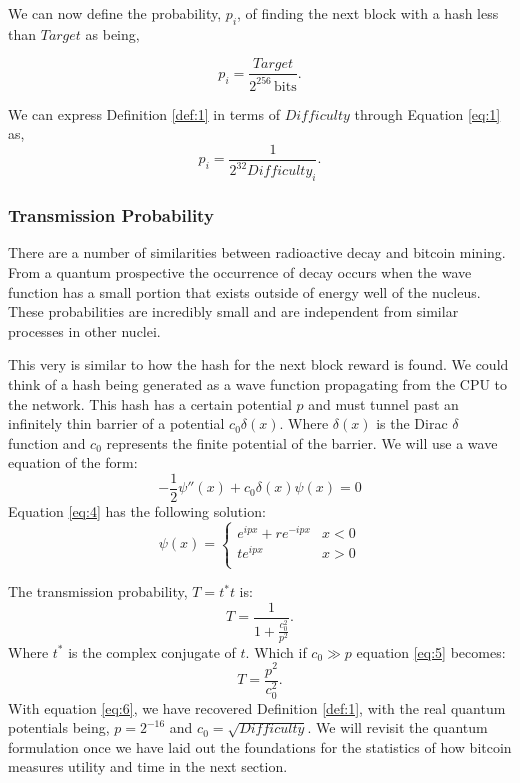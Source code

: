 \documentclass[runningheads]{llncs}
\begin{document}
We can now define the probability, $p_i$, of finding the next block with a hash less than $Target$ as being,
\begin{definition} \label{def:1}
    \begin{equation}
        p_i = \frac{Target}{2^{256}\,\mathrm{bits}}.
    \end{equation}
\end{definition}

We can express Definition \ref{def:1} in terms of $Difficulty$ through Equation \ref{eq:1} as,
\begin{equation}
    p_i = \frac{1}{2^{32}Difficulty_i}. \label{eq:3}
\end{equation}

\subsubsection{Transmission Probability}
There are a number of similarities between radioactive decay and bitcoin mining.
From a quantum prospective the occurrence of decay occurs when the wave function has a small portion that exists outside of energy well of the nucleus.
These probabilities are incredibly small and are independent from similar processes in other nuclei.

This very is similar to how the hash for the next block reward is found.
We could think of a hash being generated as a wave function propagating from the CPU to the network.
This hash has a certain potential $p$ and must tunnel past an infinitely thin barrier of a potential $c_0 \delta(x)$.
Where $\delta(x)$ is the Dirac $\delta$ function and $c_0$ represents the finite potential of the barrier.
We will use a wave equation of the form:
\begin{equation}
    -\frac{1}{2}\psi''(x) + c_0 \delta(x) \psi(x) = 0 \label{eq:4}
\end{equation}
Equation \ref{eq:4} has the following solution:
\begin{equation}
    \psi(x) =\left\{
    \begin{array}{ll}
        e^{i p x} + r e^{-i p x} & x < 0 \\
        t e^{i p x}              & x > 0 \\
    \end{array}
    \right.
\end{equation}

The transmission probability, $T = t^*t$ is:
\begin{equation}
    T = \frac{1}{1+\frac{c_0^2}{p^2}}. \label{eq:5}
\end{equation}
Where $t^*$ is the complex conjugate of $t$.
Which if $c_0 \gg p$ equation \ref{eq:5} becomes:
\begin{equation}
    T = \frac{p^2}{c_0^2}. \label{eq:6}
\end{equation}
With equation \ref{eq:6}, we have recovered Definition \ref{def:1}, with the real quantum potentials being, $p = 2^{-16}$ and $c_0 = \sqrt{Difficulty}$.
We will revisit the quantum formulation once we have laid out the foundations for the statistics of how bitcoin measures utility and time in the next section.
\end{document}
